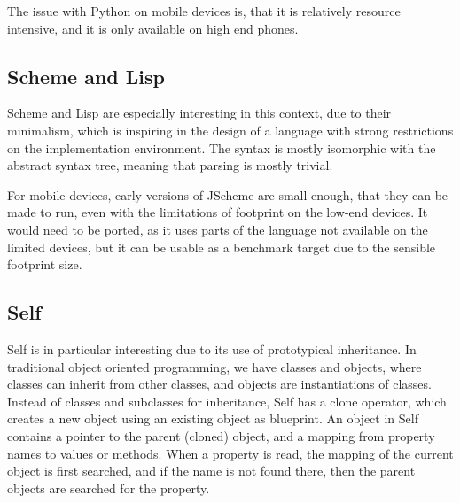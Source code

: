 \documentclass[11pt]{report}
\begin{document}
The issue with Python on mobile devices is, that it is relatively resource intensive, and it is only available on high end phones.

\subsection{Scheme and Lisp}
Scheme and Lisp are especially interesting in this context, due to their minimalism, which is inspiring in the design of a language with strong restrictions on the implementation environment.
The syntax is mostly isomorphic with the abstract syntax tree, meaning that parsing is mostly trivial.

For mobile devices, early versions of JScheme \cite{norvig-jscheme} are small enough, that they can be made to run, even with the limitations of footprint on the low-end devices. It would need to be ported, as it uses parts of the language not available on the limited devices, but it can be usable as a benchmark target due to the sensible footprint size.


\subsection{Self}
\label{survey-self}
Self \cite{self} is in particular interesting due to its use of prototypical inheritance.
In traditional object oriented programming, we have classes and objects, where classes can inherit from other classes, and objects are instantiations of classes.
Instead of classes and subclasses for inheritance, Self has a clone operator, which creates a new object using an existing object as blueprint.
An object in Self contains a pointer to the parent (cloned) object, and a mapping from property names to values or methods. When a property is read, the mapping of the current object is first searched, and if the name is not found there, then the parent objects are searched for the property.
\end{document}
